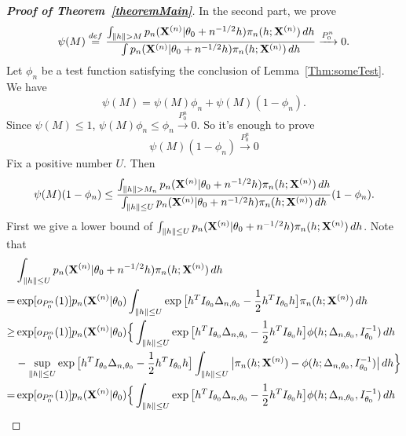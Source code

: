 \documentclass[3p]{elsarticle}
\theoremstyle{plain}
\theoremstyle{definition}
\theoremstyle{remark}
\begin{document}
\begin{appendices}
\begin{proof}[\textbf{Proof of Theorem~\ref{theoremMain}}]
In the second part, we prove
\begin{equation}\label{eq:4}
    \psi(M)\overset{def}{=}\frac{\int_{\|h\|> M}p_n(\BX^{(n)}|\theta_0+n^{-1/2}h)\pi_n(h;\BX^{(n)})\, dh}{\int p_n(\BX^{(n)}|\theta_0+n^{-1/2}h)\pi_n(h;\BX^{(n)})\, dh}
    \xrightarrow{P_0^n}0.
\end{equation}
    Let $\phi_n$ be a test function satisfying the conclusion of Lemma~\ref{Thm:someTest}. We have
\begin{equation*}
    \psi(M)
    = 
    \psi(M)\phi_n
    +
    \psi(M)(1-\phi_n).
\end{equation*}
    Since $\psi(M)\leq 1$, 
    $
    \psi(M)\phi_n\leq \phi_n\xrightarrow{P_0^n}0
    $.
So it's enough to prove
\begin{equation*}
    \psi(M)(1-\phi_n)\xrightarrow{P_0^n}0
\end{equation*}
Fix a positive number $U$. Then
\begin{equation}\label{eq:11}
\psi(M)(1-\phi_n)
    \leq \frac{\int_{\|h\|>M_n}p_n(\BX^{(n)}|\theta_0+n^{-1/2}h)\pi_n(h;\BX^{(n)})\, dh}{\int_{\|h\|\leq U} p_n(\BX^{(n)}|\theta_0+n^{-1/2}h)\pi_n(h;\BX^{(n)})\, dh}(1-\phi_n).
\end{equation}
    First we give a lower bound of $\int_{\|h\|\leq U} p_n(\mathbf{X}^{(n)}|\theta_0+n^{-1/2}h)\pi_n(h;\mathbf{X}^{(n)})\, dh$.
 Note that
\begin{equation*}
    \begin{aligned}
        &\int_{\|h\|\leq U} p_n(\BX^{(n)}|\theta_0+n^{-1/2}h)\pi_n(h;\BX^{(n)})\, dh
\\
        = &
        \exp[o_{P_0^n}(1)]
        p_n(\BX^{(n)}|\theta_0)
        \int_{\|h\|\leq U}\exp\big[ h^T I_{\theta_0}\Delta_{n,\theta_0}-\frac{1}{2}h^T I_{\theta_0} h\big]\pi_n(h;\BX^{(n)})\, dh
        \\
        \geq &
        \exp[o_{P_0^n}(1)]
        p_n(\BX^{(n)}|\theta_0)
        \Big\{
            \int_{\|h\|\leq U}\exp\big[ h^T I_{\theta_0}\Delta_{n,\theta_0}-\frac{1}{2}h^T I_{\theta_0} h\big]\phi(h;\Delta_{n,\theta_0},I_{\theta_0}^{-1})\, dh
            \\
            &-
            \sup_{\|h\|\leq U}\exp\big[ h^T I_{\theta_0}\Delta_{n,\theta_0}-\frac{1}{2}h^T I_{\theta_0} h\big]
            \int_{\|h\|\leq U}\big|\pi_n(h;\BX^{(n)})-\phi(h;\Delta_{n,\theta_0},I_{\theta_0}^{-1})\big|\, dh
            \Big\}
        \\
        = &
        \exp[o_{P_0^n}(1)]
        p_n(\BX^{(n)}|\theta_0)
        \Big\{
            \int_{\|h\|\leq U}\exp\big[ h^T I_{\theta_0}\Delta_{n,\theta_0}-\frac{1}{2}h^T I_{\theta_0} h\big]\phi(h;\Delta_{n,\theta_0},I_{\theta_0}^{-1})\, dh

\end{aligned}
\end{equation*}
\end{proof}
\end{appendices}
\end{document}
